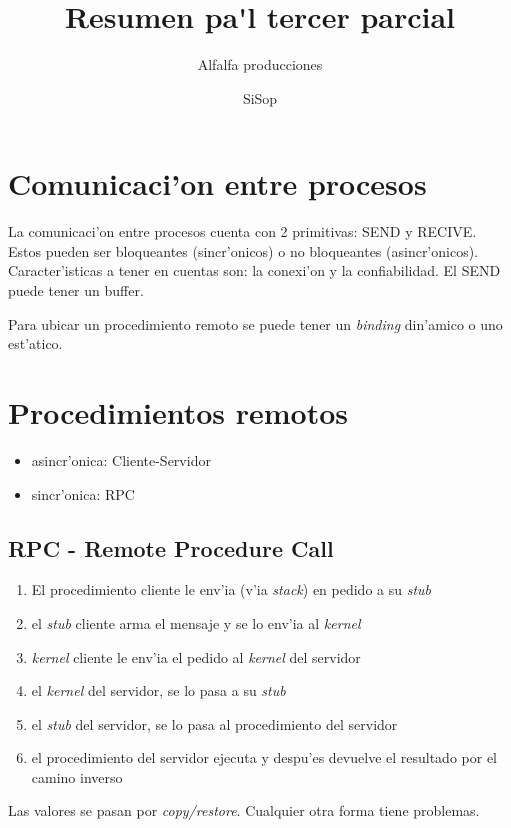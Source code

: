 \documentclass[a4paper,spanish]{article}
\title{Resumen pa\'{}l tercer parcial}
\date{SiSop}
\author{Alfalfa producciones}
\begin{document}
\maketitle

\tableofcontents

\section{Comunicaci'on entre procesos}
La comunicaci'on entre procesos cuenta con 2 primitivas: SEND y RECIVE.
Estos pueden ser bloqueantes (sincr'onicos) o no bloqueantes (asincr'onicos).
Caracter'isticas a tener en cuentas son: la conexi'on y la confiabilidad. El
SEND puede tener un buffer.

Para ubicar un procedimiento remoto se puede tener un \emph{binding} din'amico
o uno est'atico.

\section{Procedimientos remotos}
\begin{itemize}
	\item asincr'onica: Cliente-Servidor
	\item sincr'onica: RPC
\end{itemize}

\subsection{RPC - Remote Procedure Call} 
\begin{enumerate}
	\item El procedimiento cliente le env'ia (v'ia \emph{stack}) en
pedido a su \emph{stub}
	\item el \emph{stub} cliente arma el mensaje y se lo env'ia al
\emph{kernel}
	\item \emph{kernel} cliente le env'ia el pedido al \emph{kernel} del
servidor
	\item el \emph{kernel} del servidor, se lo pasa a su \emph{stub}
	\item el \emph{stub} del servidor, se lo pasa al procedimiento del
servidor
	\item el procedimiento del servidor ejecuta y despu'es devuelve el
resultado por el camino inverso
\end{enumerate}

Las valores se pasan por \emph{copy/restore}. Cualquier otra forma tiene
problemas.
\end{document}

